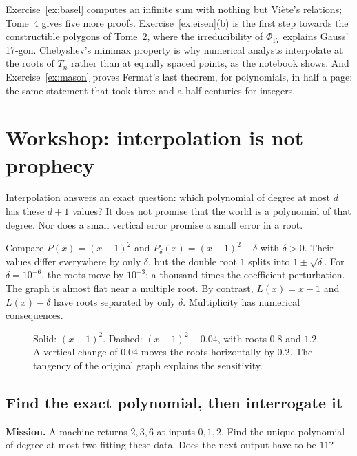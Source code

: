\begin{beauty}
Exercise~\ref{ex:basel} computes an infinite sum with nothing but Vi\`ete's relations; Tome~4 gives five more proofs.
Exercise~\ref{ex:eisen}(b) is the first step towards the constructible polygons of Tome~2, where the irreducibility of
$\Phi_{17}$ explains Gauss' 17-gon. Chebyshev's minimax property is why numerical analysts interpolate at the roots of
$T_n$ rather than at equally spaced points, as the notebook shows. And Exercise~\ref{ex:mason} proves Fermat's last theorem, for polynomials,
in half a page: the same statement that took three and a half centuries for integers.
\end{beauty}


\section{Workshop: interpolation is not prophecy}
Interpolation answers an exact question: which polynomial of degree at most $d$ has these $d+1$ values? It does not promise that the world is a polynomial of that degree. Nor does a small vertical error promise a small error in a root.

\begin{examplex}
Compare $P(x)=(x-1)^2$ and $P_\delta(x)=(x-1)^2-\delta$ with $\delta>0$. Their values differ everywhere by only $\delta$, but the double root $1$ splits into $1\pm\sqrt\delta$. For $\delta=10^{-6}$, the roots move by $10^{-3}$: a thousand times the coefficient perturbation. The graph is almost flat near a multiple root. By contrast, $L(x)=x-1$ and $L(x)-\delta$ have roots separated by only $\delta$. Multiplicity has numerical consequences.
\end{examplex}

\begin{figure}[ht]\centering{}
\caption{Solid: $(x-1)^2$. Dashed: $(x-1)^2-0.04$, with roots $0.8$ and $1.2$. A vertical change of $0.04$ moves the roots horizontally by $0.2$. The tangency of the original graph explains the sensitivity.}\end{figure}

\subsection*{Find the exact polynomial, then interrogate it}
\textbf{Mission.} A machine returns $2,3,6$ at inputs $0,1,2$. Find the unique polynomial of degree at most two fitting these data. Does the next output have to be $11$?

